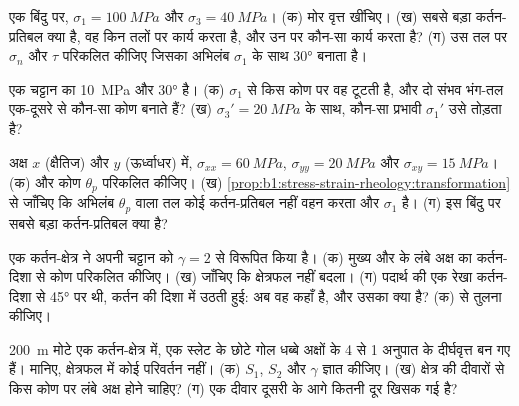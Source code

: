 \begin{exercise}[$\star$]\label{exo:b1:stress-strain-rheology:3}
एक बिंदु पर, $\sigma_1 = \qty{100}{MPa}$ और $\sigma_3 = \qty{40}{MPa}$। (क) मोर वृत्त खींचिए। (ख) सबसे बड़ा कर्तन-प्रतिबल क्या है, वह किन तलों पर कार्य करता है, और उन पर कौन-सा  कार्य करता है? (ग) उस तल पर $\sigma_n$ और $\tau$ परिकलित कीजिए जिसका अभिलंब $\sigma_1$ के साथ \ang{30} बनाता है।
\end{exercise}

\begin{exercise}[$\star$]\label{exo:b1:stress-strain-rheology:4}
एक चट्टान का  \qty{10}{MPa} और  \ang{30} है। (क) $\sigma_1$ से किस कोण पर वह टूटती है, और दो संभव भंग-तल एक-दूसरे से कौन-सा कोण बनाते हैं? (ख) $\sigma_3' = \qty{20}{MPa}$ के साथ, कौन-सा प्रभावी $\sigma_1'$ उसे तोड़ता है?
\end{exercise}

\begin{exercise}[$\star\star$]\label{exo:b1:stress-strain-rheology:5}
अक्ष $x$ (क्षैतिज) और $y$ (ऊर्ध्वाधर) में, $\sigma_{xx} = \qty{60}{MPa}$, $\sigma_{yy} = \qty{20}{MPa}$ और $\sigma_{xy} = \qty{15}{MPa}$। (क)  और कोण $\theta_p$ परिकलित कीजिए। (ख) \cref{prop:b1:stress-strain-rheology:transformation} से जाँचिए कि अभिलंब $\theta_p$ वाला तल कोई कर्तन-प्रतिबल नहीं वहन करता और  $\sigma_1$ है। (ग) इस बिंदु पर सबसे बड़ा कर्तन-प्रतिबल क्या है?
\end{exercise}

\begin{exercise}[$\star\star$]\label{exo:b1:stress-strain-rheology:6}
एक कर्तन-क्षेत्र ने अपनी चट्टान को  $\gamma = 2$ से विरूपित किया है। (क) मुख्य  और  के लंबे अक्ष का कर्तन-दिशा से कोण परिकलित कीजिए। (ख) जाँचिए कि क्षेत्रफल नहीं बदला। (ग) पदार्थ की एक रेखा कर्तन-दिशा से \ang{45} पर थी, कर्तन की दिशा में उठती हुई: अब वह कहाँ है, और उसका  क्या है? (क) से तुलना कीजिए।
\end{exercise}

\begin{exercise}[$\star\star$]\label{exo:b1:stress-strain-rheology:7}
\qty{200}{m} मोटे एक कर्तन-क्षेत्र में, एक स्लेट के छोटे गोल धब्बे अक्षों के 4 से 1 अनुपात के दीर्घवृत्त बन गए हैं।  मानिए, क्षेत्रफल में कोई परिवर्तन नहीं। (क) $S_1$, $S_2$ और $\gamma$ ज्ञात कीजिए। (ख) क्षेत्र की दीवारों से किस कोण पर लंबे अक्ष होने चाहिए? (ग) एक दीवार दूसरी के आगे कितनी दूर खिसक गई है?
\end{exercise}

